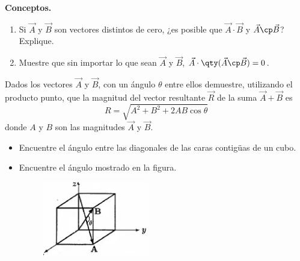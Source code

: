 \begin{mdframed}[style=warning]
	\begin{ejercicio}
		\textbf{Conceptos.}
		\begin{enumerate}
			\item Si $\vec{A}$ y $\vec{B}$ son vectores distintos de cero, ¿es posible que $\vec{A} \cdot \vec{B}$ y $\vec{A} \cp \vec{B}$? Explique.
			\item Muestre que sin importar lo que sean $\vec{A}$ y $\vec{B}$, $\vec{A} \cdot \qty(\vec{A} \cp \vec{B}) = 0$.
		\end{enumerate}
	\end{ejercicio}
\end{mdframed}









\begin{mdframed}[style=warning]
	\begin{ejercicio}
		Dados los vectores $\vec{A}$ y $\vec{B}$, con un ángulo $\theta$ entre ellos demuestre, utilizando el producto punto, que la magnitud del vector resultante $\vec{R}$ de la suma $\vec{A} + \vec{B}$ es
			$$ R = \sqrt{A^2 + B^2 + 2AB\cos{\theta}} $$
		donde $A$ y $B$ son las magnitudes $\vec{A}$ y $\vec{B}$.
	\end{ejercicio}
\end{mdframed}







\begin{mdframed}[style=warning]
	\begin{ejercicio}
		\begin{itemize}
			\item Encuentre el ángulo entre las diagonales de las caras contigüas de un cubo.
			\item Encuentre el ángulo mostrado en la figura.
			\begin{figure}[H]
				\centering
				\includegraphics[scale=0.5]{./img/cube.png}
			\end{figure}
		\end{itemize}
	\end{ejercicio}
\end{mdframed}






